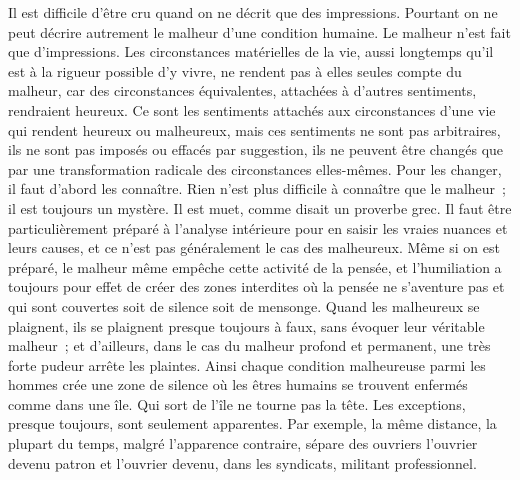 \documentclass[french,twoside]{book} %
\begin{document}
Il est difficile d'être cru quand on ne décrit que des impressions. Pourtant on ne peut décrire autrement le malheur d'une condition humaine. Le malheur n'est fait que d'impressions. Les circonstances matérielles de la vie, aussi longtemps qu'il est à la rigueur possible d'y vivre, ne rendent pas à elles seules compte du malheur, car des circonstances équivalentes, attachées à d'autres sentiments, rendraient heureux. Ce sont les sentiments attachés aux circonstances d'une vie qui rendent heureux ou malheureux, mais ces sentiments ne sont pas arbitraires, ils ne sont pas imposés ou effacés par suggestion, ils ne peuvent être changés que par une transformation radicale des circonstances elles-mêmes. Pour les changer, il faut d'abord les connaître. Rien n'est plus difficile à connaître que le malheur ; il est toujours un mystère. Il est muet, comme disait un proverbe grec. Il faut être particulièrement préparé à l'analyse intérieure pour en saisir les vraies nuances et leurs causes, et ce n'est pas généralement le cas des malheureux. Même si on est préparé, le malheur même empêche cette activité de la pensée, et l'humiliation a toujours pour effet de créer des zones interdites où la pensée ne s'aventure pas et qui sont couvertes soit de silence soit de mensonge. Quand les malheureux se plaignent, ils se plaignent presque toujours à faux, sans évoquer leur véritable malheur ; et d'ailleurs, dans le cas du malheur profond et permanent, une très forte pudeur arrête les plaintes. Ainsi chaque condition malheureuse parmi les hommes crée une zone de silence où les êtres humains se trouvent enfermés comme dans une île. Qui sort de l'île ne tourne pas la tête. Les exceptions, presque toujours, sont seulement apparentes. Par exemple, la même distance, la plupart du temps, malgré l'apparence contraire, sépare des ouvriers l'ouvrier devenu patron et l'ouvrier devenu, dans les syndicats, militant professionnel.\par
\end{document}
